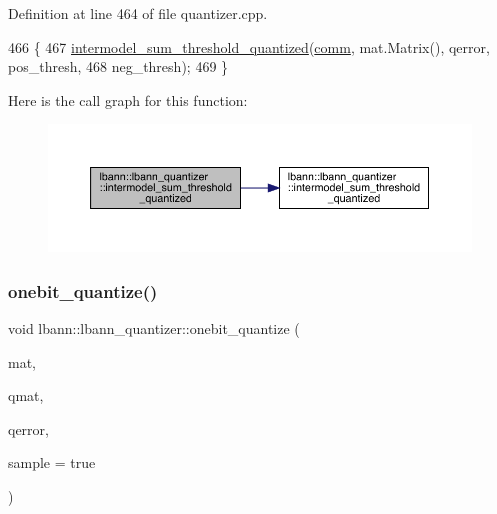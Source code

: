 Definition at line 464 of file quantizer.\+cpp.


\begin{DoxyCode}
466                        \{
467   \hyperlink{classlbann_1_1lbann__quantizer_a0bd572557675705c5e080b92d74b02ae}{intermodel\_sum\_threshold\_quantized}(\hyperlink{file__io_8cpp_ab048c6f9fcbcfaa57ce68b00263dbebe}{comm}, mat.Matrix(), qerror, 
      pos\_thresh,
468                                      neg\_thresh);
469 \}
\end{DoxyCode}
Here is the call graph for this function\+:\nopagebreak
\begin{figure}[H]
\begin{center}
\leavevmode
\includegraphics[width=350pt]{classlbann_1_1lbann__quantizer_ac2afc78996f35d90b5d0462292a1a2e3_cgraph}
\end{center}
\end{figure}
\mbox{\label{classlbann_1_1lbann__quantizer_a4dd4696cbbfd93c73e5fb3c40fcb16c3}} 
\subsubsection{\texorpdfstring{onebit\+\_\+quantize()}{onebit\_quantize()}\hspace{0.1cm}{\footnotesize\ttfamily [1/2]}}
{\footnotesize\ttfamily void lbann\+::lbann\+\_\+quantizer\+::onebit\+\_\+quantize (\begin{DoxyParamCaption}\item[{const \hyperlink{base_8hpp_a68f11fdc31b62516cb310831bbe54d73}{Mat} \&}]{mat,  }\item[{\hyperlink{classlbann_1_1lbann__quantizer_a399f3f8c393b6021b43e95d1ce6ea28c}{Quantized\+Matrix} \&}]{qmat,  }\item[{\hyperlink{base_8hpp_a68f11fdc31b62516cb310831bbe54d73}{Mat} \&}]{qerror,  }\item[{bool}]{sample = {\ttfamily true} }\end{DoxyParamCaption})}

